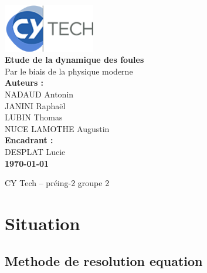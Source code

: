 \documentclass[a4paper,12pt]{article}
\begin{document}
\begin{titlepage}
	\centering
	\includegraphics[width=4cm]{logo.png} \\[1cm]  %

	{\LARGE \textbf{Etude de la dynamique des foules}} \\[0.5cm]
    
	{\large Par le biais de la physique moderne} \\[1.5cm]

	\textbf{Auteurs :} \\[0.3cm]
	NADAUD Antonin \\
	JANINI  Raphaël \\
	LUBIN Thomas \\
	NUCE LAMOTHE Augustin \\[1cm]

	\textbf{Encadrant :} \\[0.3cm]
	DESPLAT Lucie \\[1.5cm]

	\textbf{\today}  %
	\\[2cm]

	\vfill %

	{\large CY Tech – préing-2 groupe 2} \\

\end{titlepage}

\newpage
\thispagestyle{empty}  %
\mbox{}  %

\newpage


\renewcommand{\contentsname}{Sommaire}  %
\tableofcontents  %

\newpage


\section{Situation}

\subsection{Methode de resolution equation}
\end{document}
